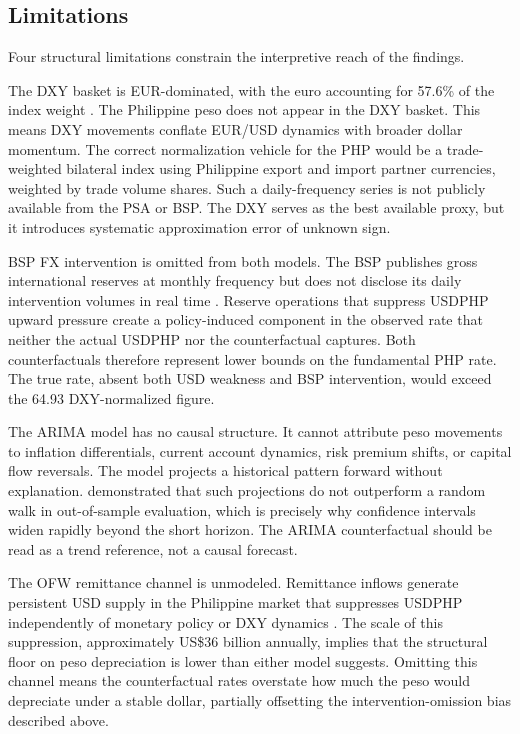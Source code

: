 \documentclass[12pt]{article}
\begin{document}
\subsection{Limitations}

Four structural limitations constrain the interpretive reach of the findings.

The DXY basket is EUR-dominated, with the euro accounting for 57.6\% of the index
weight \citep{ice2023}. The Philippine peso does not appear in the DXY basket. This
means DXY movements conflate EUR/USD dynamics with broader dollar momentum. The
correct normalization vehicle for the PHP would be a trade-weighted bilateral index
using Philippine export and import partner currencies, weighted by trade volume shares.
Such a daily-frequency series is not publicly available from the PSA or BSP. The DXY
serves as the best available proxy, but it introduces systematic approximation error
of unknown sign.

BSP FX intervention is omitted from both models. The BSP publishes gross
international reserves at monthly frequency but does not disclose its daily
intervention volumes in real time \citep{bsp2024}. Reserve operations that suppress
USDPHP upward pressure create a policy-induced component in the observed rate that
neither the actual USDPHP nor the counterfactual captures. Both counterfactuals
therefore represent lower bounds on the fundamental PHP rate. The true rate, absent
both USD weakness and BSP intervention, would exceed the 64.93 DXY-normalized figure.

The ARIMA model has no causal structure. It cannot attribute peso movements to
inflation differentials, current account dynamics, risk premium shifts, or capital
flow reversals. The model projects a historical pattern forward without explanation.
\citet{meese1983} demonstrated that such projections do not outperform a random walk
in out-of-sample evaluation, which is precisely why confidence intervals widen
rapidly beyond the short horizon. The ARIMA counterfactual should be read as a trend
reference, not a causal forecast.

The OFW remittance channel is unmodeled. Remittance inflows generate persistent
USD supply in the Philippine market that suppresses USDPHP independently of
monetary policy or DXY dynamics \citep{worldbank2023}. The scale of this suppression,
approximately US\$36 billion annually, implies that the structural floor on peso
depreciation is lower than either model suggests. Omitting this channel means the
counterfactual rates overstate how much the peso would depreciate under a stable
dollar, partially offsetting the intervention-omission bias described above.
\end{document}
